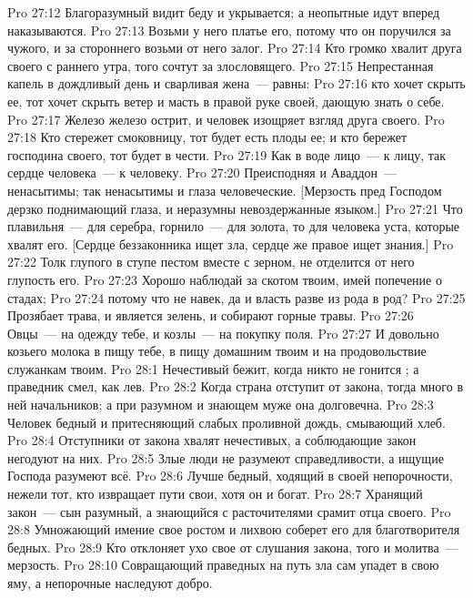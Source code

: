 \vs Pro 27:12 Благоразумный видит беду и укрывается; а неопытные идут вперед  наказываются.
\vs Pro 27:13 Возьми у него платье его, потому что он поручился за чужого, и за стороннего возьми от него залог.
\vs Pro 27:14 Кто громко хвалит друга своего с раннего утра, того сочтут за злословящего.
\vs Pro 27:15 Непрестанная капель в дождливый день и сварливая жена~--- равны:
\vs Pro 27:16 кто хочет скрыть ее, тот хочет скрыть ветер и масть в правой руке своей, дающую знать о себе.
\vs Pro 27:17 Железо железо острит, и человек изощряет взгляд друга своего.
\vs Pro 27:18 Кто стережет смоковницу, тот будет есть плоды ее; и кто бережет господина своего, тот будет в чести.
\vs Pro 27:19 Как в воде лицо~--- к лицу, так сердце человека~--- к человеку.
\vs Pro 27:20 Преисподняя и Аваддон~--- ненасытимы; так ненасытимы и глаза человеческие. [Мерзость пред Господом дерзко поднимающий глаза, и неразумны невоздержанные языком.]
\vs Pro 27:21 Что плавильня~--- для серебра, горнило~--- для золота, то для человека уста, которые хвалят его. [Сердце беззаконника ищет зла, сердце же правое ищет знания.]
\vs Pro 27:22 Толк глупого в ступе пестом вместе с зерном, не отделится от него глупость его.
\vs Pro 27:23 Хорошо наблюдай за скотом твоим, имей попечение о стадах;
\vs Pro 27:24 потому что  не навек, да и власть разве из рода в род?
\vs Pro 27:25 Прозябает трава, и является зелень, и собирают горные травы.
\vs Pro 27:26 Овцы~--- на одежду тебе, и козлы~--- на покупку поля.
\vs Pro 27:27 И довольно козьего молока в пищу тебе, в пищу домашним твоим и на продовольствие служанкам твоим.
\vs Pro 28:1 Нечестивый бежит, когда никто не гонится ; а праведник смел, как лев.
\vs Pro 28:2 Когда страна отступит от закона, тогда много в ней начальников; а при разумном и знающем муже она долговечна.
\vs Pro 28:3 Человек бедный и притесняющий слабых  проливной дождь, смывающий хлеб.
\vs Pro 28:4 Отступники от закона хвалят нечестивых, а соблюдающие закон негодуют на них.
\vs Pro 28:5 Злые люди не разумеют справедливости, а ищущие Господа разумеют всё.
\vs Pro 28:6 Лучше бедный, ходящий в своей непорочности, нежели тот, кто извращает пути свои, хотя он и богат.
\vs Pro 28:7 Хранящий закон~--- сын разумный, а знающийся с расточителями срамит отца своего.
\vs Pro 28:8 Умножающий имение свое ростом и лихвою соберет его для благотворителя бедных.
\vs Pro 28:9 Кто отклоняет ухо свое от слушания закона, того и молитва~--- мерзость.
\vs Pro 28:10 Совращающий праведных на путь зла сам упадет в свою яму, а непорочные наследуют добро.
